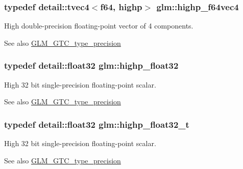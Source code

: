 \subsubsection[{\texorpdfstring{highp\+\_\+f64vec4}{highp_f64vec4}}]{\setlength{\rightskip}{0pt plus 5cm}typedef detail\+::tvec4$<$f64, highp$>$ {\bf glm\+::highp\+\_\+f64vec4}}\hypertarget{group__gtc__type__precision_ga1e9d8145fb9521701a5eeb6df5754184}{}\label{group__gtc__type__precision_ga1e9d8145fb9521701a5eeb6df5754184}
High double-\/precision floating-\/point vector of 4 components. \begin{DoxySeeAlso}{See also}
\hyperlink{group__gtc__type__precision}{G\+L\+M\+\_\+\+G\+T\+C\+\_\+type\+\_\+precision} 
\end{DoxySeeAlso}
\subsubsection[{\texorpdfstring{highp\+\_\+float32}{highp_float32}}]{\setlength{\rightskip}{0pt plus 5cm}typedef detail\+::float32 {\bf glm\+::highp\+\_\+float32}}\hypertarget{group__gtc__type__precision_ga91af7513c1102410646f2c435ca29be5}{}\label{group__gtc__type__precision_ga91af7513c1102410646f2c435ca29be5}
High 32 bit single-\/precision floating-\/point scalar. \begin{DoxySeeAlso}{See also}
\hyperlink{group__gtc__type__precision}{G\+L\+M\+\_\+\+G\+T\+C\+\_\+type\+\_\+precision} 
\end{DoxySeeAlso}
\subsubsection[{\texorpdfstring{highp\+\_\+float32\+\_\+t}{highp_float32_t}}]{\setlength{\rightskip}{0pt plus 5cm}typedef detail\+::float32 {\bf glm\+::highp\+\_\+float32\+\_\+t}}\hypertarget{group__gtc__type__precision_ga4e16a7818d09e2da3b81765999f23928}{}\label{group__gtc__type__precision_ga4e16a7818d09e2da3b81765999f23928}
High 32 bit single-\/precision floating-\/point scalar. \begin{DoxySeeAlso}{See also}
\hyperlink{group__gtc__type__precision}{G\+L\+M\+\_\+\+G\+T\+C\+\_\+type\+\_\+precision} 
\end{DoxySeeAlso}
